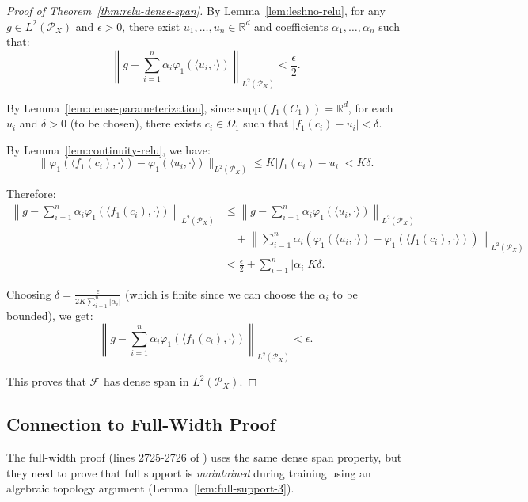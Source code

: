 \begin{proof}[Proof of Theorem~\ref{thm:relu-dense-span}]
By Lemma~\ref{lem:leshno-relu}, for any $g \in L^2(\mathcal{P}_X)$ and $\epsilon > 0$, there exist $u_1, \ldots, u_n \in \mathbb{R}^d$ and coefficients $\alpha_1, \ldots, \alpha_n$ such that:
\[
\left\|g - \sum_{i=1}^n \alpha_i \varphi_1(\langle u_i, \cdot\rangle)\right\|_{L^2(\mathcal{P}_X)} < \frac{\epsilon}{2}.
\]

By Lemma~\ref{lem:dense-parameterization}, since $\text{supp}(f_1(C_1)) = \mathbb{R}^d$, for each $u_i$ and $\delta > 0$ (to be chosen), there exists $c_i \in \Omega_1$ such that $|f_1(c_i) - u_i| < \delta$.

By Lemma~\ref{lem:continuity-relu}, we have:
\[
\|\varphi_1(\langle f_1(c_i), \cdot\rangle) - \varphi_1(\langle u_i, \cdot\rangle)\|_{L^2(\mathcal{P}_X)} \le K |f_1(c_i) - u_i| < K\delta.
\]

Therefore:
\begin{align*}
\left\|g - \sum_{i=1}^n \alpha_i \varphi_1(\langle f_1(c_i), \cdot\rangle)\right\|_{L^2(\mathcal{P}_X)}
&\le \left\|g - \sum_{i=1}^n \alpha_i \varphi_1(\langle u_i, \cdot\rangle)\right\|_{L^2(\mathcal{P}_X)}\\
&\quad + \left\|\sum_{i=1}^n \alpha_i (\varphi_1(\langle u_i, \cdot\rangle) - \varphi_1(\langle f_1(c_i), \cdot\rangle))\right\|_{L^2(\mathcal{P}_X)}\\
&< \frac{\epsilon}{2} + \sum_{i=1}^n |\alpha_i| K\delta.
\end{align*}

Choosing $\delta = \frac{\epsilon}{2K \sum_{i=1}^n |\alpha_i|}$ (which is finite since we can choose the $\alpha_i$ to be bounded), we get:
\[
\left\|g - \sum_{i=1}^n \alpha_i \varphi_1(\langle f_1(c_i), \cdot\rangle)\right\|_{L^2(\mathcal{P}_X)} < \epsilon.
\]

This proves that $\mathcal{F}$ has dense span in $L^2(\mathcal{P}_X)$.
\end{proof}

\subsection{Connection to Full-Width Proof}

The full-width proof (lines 2725-2726 of \cite{nguyen2023rigorousframeworkmeanfield}) uses the same dense span property, but they need to prove that full support is \emph{maintained} during training using an algebraic topology argument (Lemma~\ref{lem:full-support-3}).

